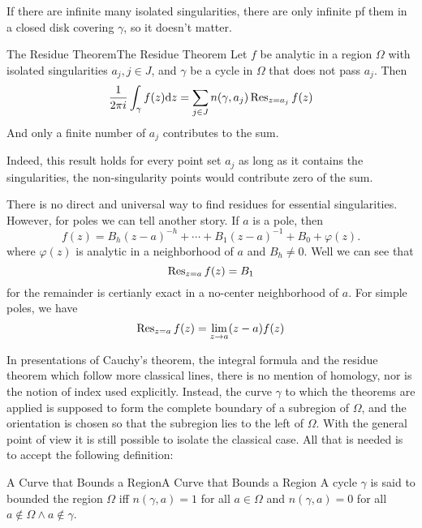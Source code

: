 \documentclass[../main.tex]{subfiles}
\begin{document}
If there are infinite many isolated singularities, there are only infinite pf them in a closed disk covering $\gamma$, so it doesn't matter.

\begin{theorem}{The Residue Theorem}{The Residue Theorem}
	Let $f$ be analytic in a region $\Omega$ with isolated singularities $a_j,j\in J$, and $\gamma$ be a cycle in $\Omega$ that does not pass $a_j$. Then
	\begin{equation}
		\frac{1}{2 \pi i} \int_{\gamma} f(z) \mathrm{d} z = \sum_{j\in J} n(\gamma,a_j) \operatorname{Res}_{z=a_j}f(z)
	\end{equation}
	And only a finite number of $a_j$ contributes to the sum.
\end{theorem}

\begin{remark}
	Indeed, this result holds for every point set $a_j$ as long as it contains the singularities, the non-singularity points would contribute zero of the sum.
\end{remark}

There is no direct and universal way to find residues for essential singularities. However, for poles we can tell another story. If $a$ is a pole, then
\begin{equation*}
	f(z) = B_h (z-a)^{-h} + \cdots + B_1 (z-a)^{-1} + B_0 + \varphi(z).
\end{equation*}
where $\varphi(z)$ is analytic in a neighborhood of $a$ and $B_h \neq 0$. Well we can see that
\begin{equation}
	\operatorname{Res}_{z=a}f(z) = B_1
\end{equation}
for the remainder is certianly exact in a no-center neighborhood of $a$. For simple poles, we have
\begin{equation}
	\operatorname{Res}_{z=a}f(z) = \lim_{z\to a} (z-a)f(z)
\end{equation}

\begin{remark}
	In presentations of Cauchy's theorem, the integral formula
and the residue theorem which follow more classical lines, there is no
mention of homology, nor is the notion of index used explicitly. Instead, the curve $\gamma$ to which the theorems are applied is supposed to form the complete boundary of a subregion of $\Omega$, and the orientation is chosen so that the subregion lies to the left of $\Omega$. With the general point of view it is still possible to isolate the classical case. All that is needed is to accept the following definition:
\end{remark}
\begin{definition}{A Curve that Bounds a Region}{A Curve that Bounds a Region}
	A cycle $\gamma$ is said to bounded the region $\Omega$ iff $n(\gamma,a)=1$ for all $a\in \Omega$ and $n(\gamma,a)=0$ for all $a\notin \Omega\land a\notin \gamma$.
\end{definition}
\end{document}

